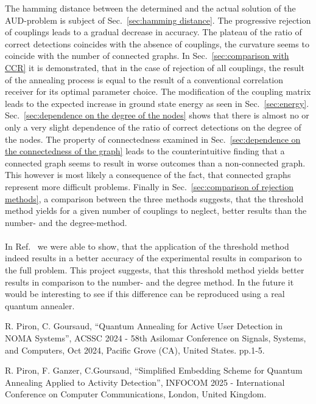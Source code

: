 \documentclass{article}
\begin{document}
The hamming distance between the determined and the actual solution of the AUD-problem is subject of Sec.~\ref{sec:hamming distance}. The progressive rejection of couplings leads to a gradual decrease in accuracy. The plateau of the ratio of correct detections coincides with the absence of couplings, the curvature seems to coincide with the number of connected graphs. In Sec.~\ref{sec:comparison with CCR} it is demonstrated, that in the case of rejection of all couplings, the result of the annealing process is equal to the result of a conventional correlation receiver for its optimal parameter choice. The modification of the coupling matrix leads to the expected increase in ground state energy as seen in Sec.~\ref{sec:energy}. Sec.~\ref{sec:dependence on the degree of the nodes} shows that there is almost no or only a very slight dependence of the ratio of correct detections on the degree of the nodes. The property of connectedness examined in Sec.~\ref{sec:dependence on the connectedness of the graph} leads to the counterintuitive finding that a connected graph seems to result in worse outcomes than a non-connected graph. This however is most likely a consequence of the fact, that connected graphs represent more difficult problems. Finally in Sec.~\ref{sec:comparison of rejection methods}, a comparison between the three methods suggests, that the threshold method yields for a given number of couplings to neglect, better results than the number- and the degree-method.
\\\\
In Ref.~\cite{PirGanGou25} we were able to show, that the application of the threshold method indeed results in a better accuracy of the experimental results in comparison to the full problem. This project suggests, that this threshold method yields better results in comparison to the number- and the degree method. In the future it would be interesting to see if this difference can be reproduced using a real quantum annealer. 
	
	
\begin{thebibliography}{9}
	R. Piron, C. Goursaud, ``Quantum Annealing for Active User Detection in NOMA Systems'', ACSSC 2024 - 58th Asilomar Conference on Signals, Systems, and Computers, Oct 2024, Pacific Grove
	(CA), United States. pp.1-5. 
	
	R. Piron, F. Ganzer, C.Goursaud, ``Simplified Embedding Scheme for Quantum
	Annealing Applied to Activity Detection'', INFOCOM 2025 - International Conference on Computer Communications, London, United Kingdom.
\end{thebibliography}
	
	
\end{document}
